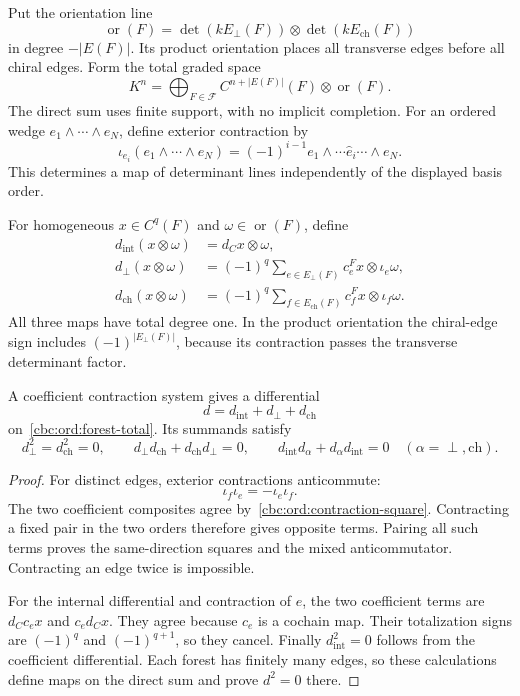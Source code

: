Put the orientation line
\[
 \operatorname{or}(F)
 =\det(kE_\perp(F))\otimes\det(kE_{\mathrm{ch}}(F))
\]
in degree $-|E(F)|$. Its product orientation places all transverse edges before all chiral edges. Form the total graded space
\begin{equation}\label{cbc:ord:forest-total}
 K^n=\bigoplus_{F\in\mathcal F}
 C^{n+|E(F)|}(F)\otimes\operatorname{or}(F).
\end{equation}
The direct sum uses finite support, with no implicit completion. For an ordered wedge $e_1\wedge\cdots\wedge e_N$, define exterior contraction by
\[
 \iota_{e_i}(e_1\wedge\cdots\wedge e_N)
 =(-1)^{i-1}e_1\wedge\cdots\widehat e_i\cdots\wedge e_N.
\]
This determines a map of determinant lines independently of the displayed basis order.

For homogeneous $x\in C^q(F)$ and $\omega\in\operatorname{or}(F)$, define
\begin{align}
 d_{\mathrm{int}}(x\otimes\omega)&=d_Cx\otimes\omega,
 \label{cbc:ord:forest-internal}\\
 d_\perp(x\otimes\omega)
 &=(-1)^q\sum_{e\in E_\perp(F)}c_e^Fx\otimes\iota_e\omega,
 \label{cbc:ord:forest-transverse}\\
 d_{\mathrm{ch}}(x\otimes\omega)
 &=(-1)^q\sum_{f\in E_{\mathrm{ch}}(F)}c_f^Fx\otimes\iota_f\omega.
 \label{cbc:ord:forest-chiral}
\end{align}
All three maps have total degree one. In the product orientation the chiral-edge sign includes $(-1)^{|E_\perp(F)|}$, because its contraction passes the transverse determinant factor.

\begin{theorem}\label{cbc:ord:forest-d}
A coefficient contraction system gives a differential
\[
 d=d_{\mathrm{int}}+d_\perp+d_{\mathrm{ch}}
\]
on~\eqref{cbc:ord:forest-total}. Its summands satisfy
\[
 d_\perp^2=d_{\mathrm{ch}}^2=0,
 \qquad d_\perp d_{\mathrm{ch}}+d_{\mathrm{ch}}d_\perp=0,
 \qquad d_{\mathrm{int}}d_\alpha+d_\alpha d_{\mathrm{int}}=0
 \quad(\alpha=\perp,\mathrm{ch}).
\]
\end{theorem}
\begin{proof}
For distinct edges, exterior contractions anticommute:
\[
 \iota_f\iota_e=-\iota_e\iota_f.
\]
The two coefficient composites agree by~\eqref{cbc:ord:contraction-square}. Contracting a fixed pair in the two orders therefore gives opposite terms. Pairing all such terms proves the same-direction squares and the mixed anticommutator. Contracting an edge twice is impossible.

For the internal differential and contraction of $e$, the two coefficient terms are $d_Cc_e x$ and $c_ed_Cx$. They agree because $c_e$ is a cochain map. Their totalization signs are $(-1)^q$ and $(-1)^{q+1}$, so they cancel. Finally $d_{\mathrm{int}}^2=0$ follows from the coefficient differential. Each forest has finitely many edges, so these calculations define maps on the direct sum and prove $d^2=0$ there.
\end{proof}

